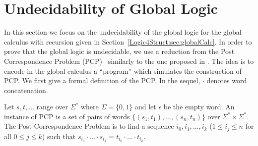 \section{Undecidability of Global Logic} \label{Logic4Struct:sec:undecidability}
%
In this section we focus on the undecidability of the global logic for
the global calculus with recursion given in
Section~\ref{Logic4Struct:sec:globalCalc}.  In order to prove that the global logic
is undecidable, we use a reduction from the Post Correspondence
Problem (PCP)~\cite{Post:pcp} similarly to the one proposed in
\cite{ct:csl01}. The idea is to encode in the global calculus a
``program'' which simulates the construction of PCP.
%
We first give a formal definition of the PCP.  In the sequel, $\cdot$
denotes word concatenation.
%
\begin{definition}[PCP]
  Let $s,t,\ldots$ range over $\Sigma^*$ where $\Sigma = \{0, 1\}$ and
  let $\epsilon$ be the empty word.  An instance of PCP is a set of
  pairs of words $\{(s_1,t_1), \ldots, (s_n,t_n)\}$ over
  $\Sigma^*\times\Sigma^*$.  The Post Correspondence Problem is to
  find a sequence $i_0,i_1,\dots,i_k$ ($1 \leq i_j \leq n$ for all
  $0\leq j \leq k$) such that $s_{i_0}\cdot \ldots \cdot s_{i_k} =
  t_{i_0}\cdot \ldots \cdot t_{i_k}$.
\end{definition}

